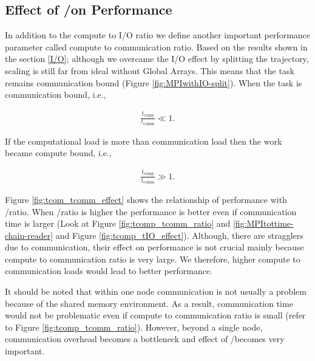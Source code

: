 \subsection{Effect of \tcomp/\tcomm on Performance}
In addition to the compute to I/O ratio we define another important performance parameter called compute to communication ratio.
Based on the results shown in the section \ref{I/O}; although we overcame the I/O effect by splitting the trajectory, scaling is still far from ideal without Global Arrays.
This means that the task remains communication bound (Figure \ref{fig:MPIwithIO-split}). 
When the task is communication bound, i.e.,

\begin{gather*}
  \frac{t_{\text{comp}}}{t_{\text{comm}}} \ll 1.
\end{gather*}

If the computational load is more than communication load then the work became compute bound, i.e.,

\begin{gather*}
  \frac{t_{\text{comp}}}{t_{\text{comm}}} \gg 1.
\end{gather*}

Figure \ref{fig:tcom_tcomm_effect} shows the relationship of performance with \tcomp/\tcomm ratio.
When \tcomp/\tcomm ratio is higher the performance is better even if communication time is larger (Look at Figure \ref{fig:tcomp_tcomm_ratio} and \ref{fig:MPItottime-chain-reader} and Figure \ref{fig:tcomp_tIO_effect}).
Although, there are stragglers due to communication, their effect on performance is not crucial mainly because compute to communication ratio is very large. 
We therefore, higher compute to communication loads would lead to better performance. 

It should be noted that within one node communication is not usually a problem because of the shared memory environment. 
As a result, communication time would not be problematic even if compute to communication ratio is small (refer to Figure \ref{fig:tcomp_tcomm_ratio}).
However, beyond a single node, communication overhead becomes a bottleneck and effect of \tcomp/\tcomm becomes very important.

